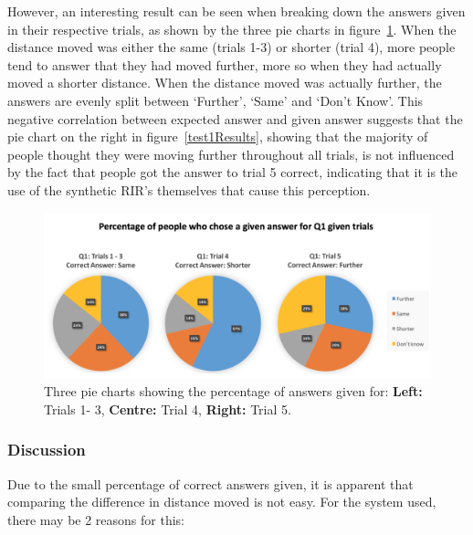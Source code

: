 \documentclass[../../main.tex]{subfiles}
\begin{document}
			However, an interesting result can be seen when breaking down the answers given in their respective trials, as shown by the three pie charts in figure~\ref{Q1Trials}. When the distance moved was either the same (trials 1-3) or shorter (trial 4), more people tend to answer that they had moved further, more so when they had actually moved a shorter distance. When the distance moved was actually further, the answers are evenly split between `Further', `Same' and `Don't Know'. This negative correlation between expected answer and given answer suggests that the pie chart on the right in figure~\ref{test1Results}, showing that the majority of people thought they were moving further throughout all trials, is not influenced by the fact that people got the answer to trial 5 correct, indicating that it is the use of the synthetic \ac{RIR}'s themselves that cause this perception.


			\begin{figure}[h]
				\centerline{\includegraphics[width=\textwidth]{Sections/userTesting/images/test1/Q1Trials.png}}
				\caption{Three pie charts showing the percentage of answers given for: \textbf{Left:} Trials 1- 3, \textbf{Centre:} Trial 4, \textbf{Right:} Trial 5.}
				\label{Q1Trials}
			\end{figure}

		\subsubsection{Discussion}


			Due to the small percentage of correct answers given, it is apparent that comparing the difference in distance moved is not easy. For the system used, there may be 2 reasons for this:
\end{document}
